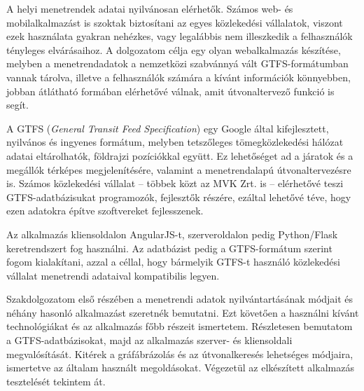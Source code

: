 
A helyi menetrendek adatai nyilvánosan elérhetők. Számos web- és mobilalkalmazást is szoktak biztosítani az egyes közlekedési vállalatok, viszont ezek használata gyakran nehézkes, vagy legalábbis nem illeszkedik a felhasználók tényleges elvárásaihoz. A dolgozatom célja egy olyan webalkalmazás készítése, melyben a menetrendadatok a nemzetközi szabvánnyá vált GTFS-formátumban vannak tárolva, illetve a felhasználók számára a kívánt információk könnyebben, jobban átlátható formában elérhetővé válnak, amit útvonaltervező funkció is segít.

A GTFS (\textit{General Transit Feed Specification}) egy Google által kifejlesztett, nyilvános és ingyenes formátum, melyben tetszőleges tömegközlekedési hálózat adatai eltárolhatók, földrajzi pozíciókkal együtt. Ez lehetőséget ad a járatok és a megállók térképes megjelenítésére, valamint a menetrendalapú útvonaltervezésre is. Számos közlekedési vállalat – többek közt az MVK Zrt. is – elérhetővé teszi GTFS-adatbázisukat programozók, fejlesztők részére, ezáltal lehetővé téve, hogy ezen adatokra építve szoftvereket fejlesszenek.

Az alkalmazás kliensoldalon AngularJS-t, szerveroldalon pedig Python/Flask keretrendszert fog használni. Az adatbázist pedig a GTFS-formátum szerint fogom kialakítani, azzal a céllal, hogy bármelyik GTFS-t használó közlekedési vállalat menetrendi adataival kompatibilis legyen.

Szakdolgozatom első részében a menetrendi adatok nyilvántartásának módjait és néhány hasonló alkalmazást szeretnék bemutatni. Ezt követően a használni kívánt technológiákat és az alkalmazás főbb részeit ismertetem. Részletesen bemutatom a GTFS-adatbázisokat, majd az alkalmazás szerver- és kliensoldali megvalósítását. Kitérek a gráfábrázolás és az útvonalkeresés lehetséges módjaira, ismertetve az általam használt megoldásokat. Végezetül az elkészített alkalmazás tesztelését tekintem át.
